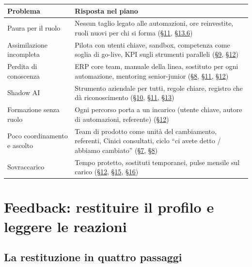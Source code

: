 \documentclass[11pt,a4paper]{article}
\begin{document}
{\small\renewcommand{\arraystretch}{1.25}
\begin{xltabular}{\linewidth}{@{}>{\raggedright\arraybackslash{}\hsize\hspace{0pt}}X>{\raggedright\arraybackslash{}\hsize\hspace{0pt}}X@{}}
\toprule
\textbf{Problema} & \textbf{Risposta nel piano} \\
\midrule
\endhead
Paura per il ruolo & Nessun taglio legato alle automazioni, ore reinvestite, ruoli nuovi per chi si forma (\hyperref[sec:11]{\S11}, \hyperref[sec:13.6]{\S13.6}) \\
Assimilazione incompleta & Pilota con utenti chiave, sandbox, competenza come soglia di go-live, KPI sugli strumenti paralleli (\hyperref[sec:9]{\S9}, \hyperref[sec:12]{\S12}) \\
Perdita di conoscenza & ERP core team, manuale della linea, sostituto per ogni automazione, mentoring senior-junior (\hyperref[sec:8]{\S8}, \hyperref[sec:11]{\S11}, \hyperref[sec:12]{\S12}) \\
Shadow AI & Strumento aziendale per tutti, regole chiare, registro che dà riconoscimento (\hyperref[sec:10]{\S10}, \hyperref[sec:11]{\S11}, \hyperref[sec:13]{\S13}) \\
Formazione senza ruolo & Ogni percorso porta a un incarico (utente chiave, autore di automazioni, referente) (\hyperref[sec:12]{\S12}) \\
Poco coordinamento e ascolto & Team di prodotto come unità del cambiamento, referenti, Cinici consultati, ciclo ``ci avete detto / abbiamo cambiato'' (\hyperref[sec:7]{\S7}, \hyperref[sec:8]{\S8}) \\
Sovraccarico & Tempo protetto, sostituti temporanei, pulse mensile sul carico (\hyperref[sec:12]{\S12}, \hyperref[sec:15]{\S15}, \hyperref[sec:16]{\S16}) \\
\bottomrule
\end{xltabular}}

\section{Feedback: restituire il profilo e leggere le reazioni}\label{sec:7}

\subsection{La restituzione in quattro passaggi}\label{sec:7.1}
\end{document}
